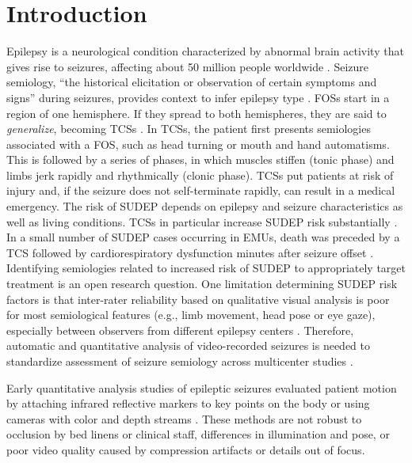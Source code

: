 \section{Introduction}



Epilepsy is a neurological condition characterized by abnormal brain activity that gives rise to seizures, affecting about 50 million people worldwide \cite{fiest_prevalence_2017}.
Seizure semiology, ``the historical elicitation or observation of certain symptoms and signs'' during seizures, provides context to infer epilepsy type \cite{fisher_operational_2017}.
\Acp{FOS} start in a region of one hemisphere.
If they spread to both hemispheres, they are said to \emph{generalize}, becoming \acp{TCS} \cite{fisher_operational_2017}.
In \acp{TCS}, the patient first presents semiologies associated with a \ac{FOS}, such as head turning or mouth and hand automatisms.
This is followed by a series of phases, in which muscles stiffen (tonic phase) and limbs jerk rapidly and rhythmically (clonic phase).
\Acp{TCS} put patients at risk of injury and, if the seizure does not self-terminate rapidly, can result in a medical emergency.
%
The risk of \ac{SUDEP} depends on epilepsy and seizure characteristics as well as living conditions.
\Acp{TCS} in particular increase \ac{SUDEP} risk substantially \cite{nashef_unifying_2012}.
In a small number of \ac{SUDEP} cases occurring in \acp{EMU}, death was preceded by a \ac{TCS} followed by cardiorespiratory dysfunction minutes after seizure offset \cite{ryvlin_incidence_2013}.
Identifying semiologies related to increased risk of \ac{SUDEP} to appropriately target treatment is an open research question.
One limitation determining \ac{SUDEP} risk factors is that inter-rater reliability based on qualitative visual analysis is poor for most semiological features (e.g., limb movement, head pose or eye gaze), especially between observers from different epilepsy centers \cite{tufenkjian_seizure_2012}.
Therefore, automatic and quantitative analysis of video-recorded seizures is needed to standardize assessment of seizure semiology across multicenter studies \cite{ahmedtaristizabal_automated_2017}.




Early quantitative analysis studies of epileptic seizures evaluated patient motion by attaching infrared reflective markers to key points on the body or using cameras with color and depth streams \cite{li_z_movement_2002,cunha_movement_2003,odwyer_lateralizing_2007,cunha_neurokinect_2016}.
These methods are not robust to occlusion by bed linens or clinical staff, differences in illumination and pose, or poor video quality caused by compression artifacts or details out of focus.

